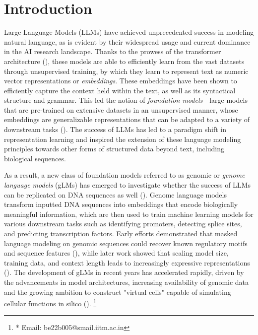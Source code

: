 \documentclass{ifacconf}
\begin{document}

\section{Introduction}
Large Language Models (LLMs) have achieved unprecedented success in modeling natural language, as is evident by their widespread usage and current dominance in the AI research landscape. Thanks to the prowess of the transformer architecture (\cite{Vaswani2017Attention}), these models are able to efficiently learn from the vast datasets through unsupervised training, by which they learn to represent text as numeric vector representations or \emph{embeddings}. These embeddings have been shown to efficiently capture the context held within the text, as well as its syntactical structure and grammar. This led the notion of \emph{foundation models} - large models that are pre-trained on extensive datasets in an unsupervised manner, whose embeddings are generalizable representations that can be adapted to a variety of downstream tasks (\cite{schneider2022foundationmodelsbriefhistorical}). The success of LLMs has led to a paradigm shift in representation learning and inspired the extension of these language modeling principles towards other forms of structured data beyond text, including biological sequences.

As a result, a new class of foundation models referred to as genomic or \emph{genome language models} (gLMs) has emerged to investigate whether the success of LLMs can be replicated on DNA sequences as well (\cite{Consens2023,Benegas2024,Liu2024LargeLM,Ruan2025}). Genome language models transform inputted DNA sequences into embeddings that encode biologically meaningful information, which are then used to train machine learning models for various downstream tasks such as identifying promoters, detecting splice sites, and predicting transcription factors. Early efforts demonstrated that masked language modeling on genomic sequences could recover known regulatory motifs and sequence features (\cite{Nguyen2023,Zhou2024,Dalla-Torre2023}), while later work showed that scaling model size, training data, and context length leads to increasingly expressive representations (\cite{Brixi2025}). The development of gLMs in recent years has accelerated rapidly, driven by the advancements in model architectures, increasing availability of genomic data and the growing ambition to construct "virtual cells" capable of simulating cellular functions in silico (\cite{Bunne2024}).
\footnote[0]{* Email: be22b005@smail.iitm.ac.in}
\end{document}
